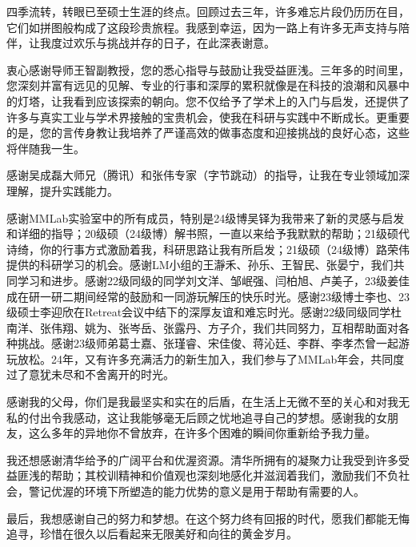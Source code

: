 
\begin{acknowledgements}
四季流转，转眼已至硕士生涯的终点。回顾过去三年，许多难忘片段仍历历在目，它们如拼图般构成了这段珍贵旅程。我感到幸运，因为一路上有许多无声支持与陪伴，让我度过欢乐与挑战并存的日子，在此深表谢意。

衷心感谢导师王智副教授，您的悉心指导与鼓励让我受益匪浅。三年多的时间里，您深刻并富有远见的见解、专业的行事和深厚的累积就像是在科技的浪潮和风暴中的灯塔，让我看到应该探索的朝向。您不仅给予了学术上的入门与启发，还提供了许多与真实工业与学术界接触的宝贵机会，使我在科研与实践中不断成长。更重要的是，您的言传身教让我培养了严谨高效的做事态度和迎接挑战的良好心态，这些将伴随我一生。

感谢吴成磊大师兄（腾讯）和张伟专家（字节跳动）的指导，让我在专业领域加深理解，提升实践能力。

感谢MMLab实验室中的所有成员，特别是24级博吴铎为我带来了新的灵感与启发和详细的指导；20级硕（24级博）解书照，一直以来给予我默默的帮助；21级硕代诗绮，你的行事方式激励着我，科研思路让我有所启发；21级硕（24级博）路荣伟提供的科研学习的机会。感谢LM小组的王瀞禾、孙乐、王智民、张晏宁，我们共同学习和进步。感谢22级同级的同学刘文洋、邹岷强、闫柏旭、卢美子，23级姜佳成在研一研二期间经常的鼓励和一同游玩解压的快乐时光。感谢23级博士李也、23级硕士李迎欣在Retreat会议中结下的深厚友谊和难忘时光。感谢22级同级同学杜南洋、张伟翔、姚为、张岑岳、张露丹、方子介，我们共同努力，互相帮助面对各种挑战。感谢23级师弟葛士嘉、张瑾睿、宋佳俊、蒋沁廷、李群、李孝杰曾一起游玩放松。24年，又有许多充满活力的新生加入，我们参与了MMLab年会，共同度过了意犹未尽和不舍离开的时光。

感谢我的父母，你们是我最坚实和实在的后盾，在生活上无微不至的关心和对我无私的付出令我感动，这让我能够毫无后顾之忧地追寻自己的梦想。感谢我的女朋友，这么多年的异地你不曾放弃，在许多个困难的瞬间你重新给予我力量。

我还想感谢清华给予的广阔平台和优渥资源。清华所拥有的凝聚力让我受到许多受益匪浅的帮助；其校训精神和价值观也深刻地感化并滋润着我们，激励我们不负社会，警记优渥的环境下所塑造的能力优势的意义是用于帮助有需要的人。

最后，我想感谢自己的努力和梦想。在这个努力终有回报的时代，愿我们都能无悔追寻，珍惜在很久以后看起来无限美好和向往的黄金岁月。


\end{acknowledgements}
